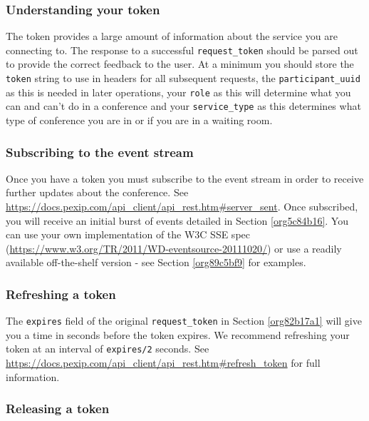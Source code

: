 \documentclass[a4paper,11pt]{article}
\begin{document}
\subsubsection{Understanding your token}
\label{sec:orgb474208}

The token provides a large amount of information about the service you
are connecting to.  The response to a successful \texttt{request\_token}
should be parsed out to provide the correct feedback to the user.  At
a minimum you should store the \texttt{token} string to use in headers for
all subsequent requests, the \texttt{participant\_uuid} as this is needed in later
operations, your \texttt{role} as this will determine what you can and can't
do in a conference and your \texttt{service\_type} as this determines what
type of conference you are in or if you are in a waiting room.

\subsubsection{Subscribing to the event stream}
\label{sec:orga5e9630}

Once you have a token you must subscribe to the event stream in order
to receive further updates about the conference.  See
\url{https://docs.pexip.com/api\_client/api\_rest.htm\#server\_sent}.  Once
subscribed, you will receive an initial burst of events detailed in
Section \ref{org5c84b16}.  You can use your own implementation of the
W3C SSE spec (\url{https://www.w3.org/TR/2011/WD-eventsource-20111020/}) or
use a readily available off-the-shelf version - see Section
\ref{org89c5bf9} for examples.

\subsubsection{Refreshing a token}
\label{sec:org551f642}

The \texttt{expires} field of the original \texttt{request\_token} in Section
\ref{org82b17a1} will give you a time in seconds before the token
expires.  We recommend refreshing your token at an interval of
\texttt{expires/2} seconds.  See
\url{https://docs.pexip.com/api\_client/api\_rest.htm\#refresh\_token} for full
information.

\subsubsection{Releasing a token}
\label{sec:orgbced0e2}
\end{document}

